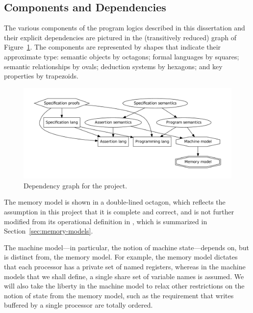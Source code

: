 \documentclass[11pt]{report}         %
\begin{document}
\subsection{Components and Dependencies}
\label{sec:components}

The various components of the program logics described in this dissertation and their explicit dependencies are pictured in the (transitively reduced) graph of Figure~\ref{fig:dependency-graph}. The components are represented by shapes that indicate their approximate type: semantic objects by octagons; formal languages by squares; semantic relationships by ovals; deduction systems by hexagons; and key properties by trapezoids. 

\begin{figure}[ht]
\includegraphics[scale=0.5]{dependency-graph/dg-reduced}
\caption{\label{fig:dependency-graph}Dependency graph for the project.}
\end{figure}

The memory model is shown in a double-lined octagon, which reflects the assumption in this project that it is complete and correct, and is not further modified from its operational definition in \cite{DBLP:conf/tphol/OwensSS09}, which is summarized in Section~\ref{sec:memory-models}. 

The machine model---in particular, the notion of machine state---depends on, but is distinct from, the memory model. For example, the memory model dictates that each processor has a private set of named registers, whereas in the machine models that we shall define, a single share set of variable names is assumed. We will also take the liberty in the machine model to relax other restrictions on the notion of state from the memory model, such as the requirement that writes buffered by a single processor are totally ordered. 
\end{document}
